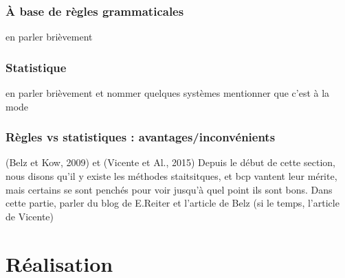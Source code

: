 \subsubsection{À base de règles grammaticales}
en parler brièvement

\subsubsection{Statistique}

en parler brièvement et nommer quelques systèmes
mentionner que c'est à la mode


\subsubsection{Règles vs statistiques : avantages/inconvénients}
(Belz et Kow, 2009) et (Vicente et Al., 2015)
Depuis le début de cette section, nous disons qu'il y existe les méthodes staitsitques, et bcp vantent leur mérite, mais certains se sont penchés pour voir jusqu'à quel point ils sont bons. Dans cette partie, parler du blog de E.Reiter et l'article de Belz (si le temps, l'article de Vicente)


\section{Réalisation}

